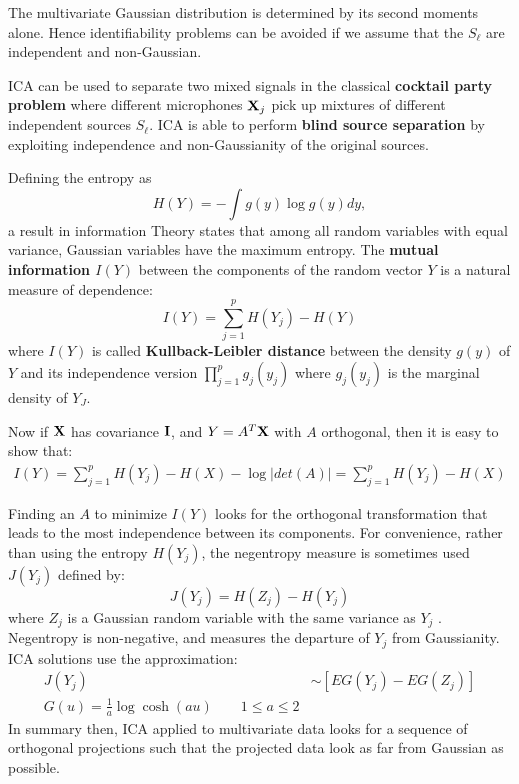 The multivariate Gaussian distribution is determined by its second moments alone. Hence identifiability problems can be avoided if we assume that the $S_\ell$ are independent and non-Gaussian.

ICA can be used to separate two mixed signals in the classical \textbf{cocktail party problem} where different microphones  $\mathrm{\mathbf{X}}_j$ pick up mixtures of different independent sources $S_\ell$. ICA is able to perform \textbf{blind source separation} by exploiting independence and non-Gaussianity of the original sources.

Defining the entropy as 
\begin{equation}
H(Y) = -\int g(y) \log g(y) dy,
\end{equation}
a result in information Theory states that among all random variables with equal variance, Gaussian variables have the maximum entropy. The \textbf{mutual information $I(Y)$}  between the components of the random vector $Y$ is a natural measure of dependence:
\begin{equation}
I(Y) = \sum_{j=1}^pH(Y_j) - H(Y)
\end{equation}
where $I(Y)$ is called \textbf{Kullback-Leibler distance} between the density $g(y)$ of $Y$ and its independence version $\prod_{j=1}^p g_j(y_j)$ where $g_j(y_j)$ is the marginal density of $Y_J$.

Now if $\mathrm{\mathbf{X}}$ has covariance $\mathrm{\mathbf{I}}$, and $Y = A^T\mathrm{\mathbf{X}}$ with $A$ orthogonal, then it is easy to show that:
\begin{equation}
\begin{aligned}
I(Y) = \sum_{j=1}^p H(Y_j)-H(X) - \log |det(A)| = \sum_{j=1}^p H(Y_j)-H(X)
\end{aligned}
\end{equation}

Finding an $A$ to minimize $I(Y)$ looks for the orthogonal transformation that leads to the most independence between its components. For convenience, rather than using the entropy $H(Y_j)$, the negentropy measure is sometimes used $J(Y_j)$ defined by:
\begin{equation}
J(Y_j) = H(Z_j) - H(Y_j)
\end{equation}
where $Z_j$ is a Gaussian random variable with the same variance as $Y_j$ . Negentropy is non-negative, and measures the departure of $Y_j$ from Gaussianity. ICA solutions use the approximation:
\begin{equation}
\begin{aligned}
J(Y_j) &\sim \left[EG(Y_j) - EG(Z_j)\right]\\
G(u) = \frac{1}{a}\log\cosh(au) \quad\quad 1\le a \le 2
\end{aligned}
\end{equation}
In summary then, ICA applied to multivariate data looks for a sequence of orthogonal projections such that the projected data look as far from Gaussian as possible.

